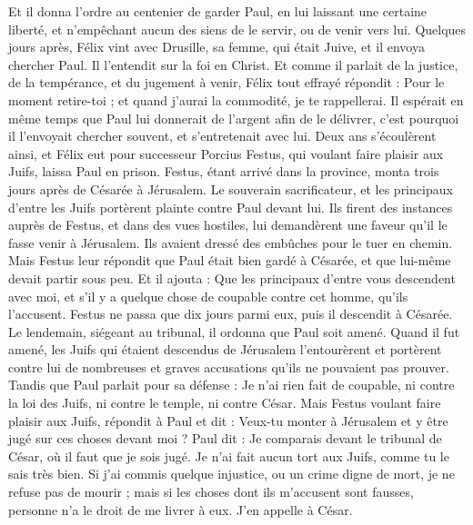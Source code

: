 \begin{multicols}{2}
{{{Et il donna l'ordre au centenier de garder Paul, en lui laissant une certaine liberté, et n'empêchant aucun des siens de le servir, ou de venir vers lui.
Quelques jours après, Félix vint avec Drusille, sa femme, qui était Juive, et il envoya chercher Paul. Il l'entendit sur la foi en Christ.
Et comme il parlait de la justice, de la tempérance, et du jugement à venir, Félix tout effrayé répondit : Pour le moment retire-toi ; et quand j'aurai la commodité, je te rappellerai.
Il espérait en même temps que Paul lui donnerait de l'argent afin de le délivrer, c'est pourquoi il l'envoyait chercher souvent, et s'entretenait avec lui.
Deux ans s'écoulèrent ainsi, et Félix eut pour successeur Porcius Festus, qui voulant faire plaisir aux Juifs, laissa Paul en prison.
\VerseOne{}Festus, étant arrivé dans la province, monta trois jours après de Césarée à Jérusalem.
Le souverain sacrificateur, et les principaux d'entre les Juifs portèrent plainte contre Paul devant lui. Ils firent des instances auprès de Festus, et dans des vues hostiles,
lui demandèrent une faveur qu'il le fasse venir à Jérusalem. Ils avaient dressé des embûches pour le tuer en chemin.
Mais Festus leur répondit que Paul était bien gardé à Césarée, et que lui-même devait partir sous peu.
Et il ajouta : Que les principaux d'entre vous descendent avec moi, et s'il y a quelque chose de coupable contre cet homme, qu'ils l'accusent.
Festus ne passa que dix jours parmi eux, puis il descendit à Césarée. Le lendemain, siégeant au tribunal, il ordonna que Paul soit amené.
Quand il fut amené, les Juifs qui étaient descendus de Jérusalem l'entourèrent et portèrent contre lui de nombreuses et graves accusations qu'ils ne pouvaient pas prouver.
Tandis que Paul parlait pour sa défense : Je n'ai rien fait de coupable, ni contre la loi des Juifs, ni contre le temple, ni contre César.
Mais Festus voulant faire plaisir aux Juifs, répondit à Paul et dit : Veux-tu monter à Jérusalem et y être jugé sur ces choses devant moi ?
Paul dit : Je comparais devant le tribunal de César, où il faut que je sois jugé. Je n'ai fait aucun tort aux Juifs, comme tu le sais très bien.
Si j'ai commis quelque injustice, ou un crime digne de mort, je ne refuse pas de mourir ; mais si les choses dont ils m'accusent sont fausses, personne n'a le droit de me livrer à eux. J'en appelle à César.
}}}
\end{multicols}
